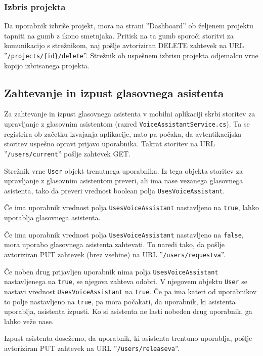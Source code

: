 \documentclass[a4paper, 12pt]{book}
\begin{document}
\subsubsection{Izbris projekta}

Da uporabnik izbriše projekt, mora na strani ''Dashboard'' ob željenem projektu tapniti na gumb z ikono smetnjaka.
Pritisk na ta gumb sporoči storitvi za komunikacijo s strežnikom, naj pošlje avtoriziran DELETE zahtevek na URL ''\texttt{/projects/\{id\}/delete}''.
Strežnik ob uspešnem izbrisu projekta odjemalcu vrne kopijo izbrisanega projekta.

\subsection{Zahtevanje in izpust glasovnega asistenta}

Za zahtevanje in izpust glasovnega asistenta v mobilni aplikaciji skrbi storitev za upravljanje z glasovnim asistentom (razred \texttt{VoiceAssistantService.cs}).
Ta se registrira ob začetku izvajanja aplikacije, nato pa počaka, da avtentikacijska storitev uspešno opravi prijavo uporabnika.
Takrat storitev na URL ''\texttt{/users/current}'' pošlje zahtevek GET.

Strežnik vrne \texttt{User} objekt trenutnega uporabnika.
Iz tega objekta storitev za upravljanje z glasovnim asistentom preveri, ali ima nase vezanega glasovnega asistenta, tako da preveri vrednost boolean polja \texttt{UsesVoiceAssistant}.

Če ima uporabnik vrednost polja \texttt{UsesVoiceAssistant} nastavljeno na \texttt{true}, lahko uporablja glasovnega asistenta.

Če ima uporabnik vrednost polja \texttt{UsesVoiceAssistant} nastavljeno na \texttt{false}, mora uporabo glasovnega asistenta zahtevati.
To naredi tako, da pošlje avtoriziran PUT zahtevek (brez vsebine) na URL ''\texttt{/users/requestva}''.

Če noben drug prijavljen uporabnik nima polja \texttt{UsesVoiceAssistant} nastavljenega na \texttt{true}, se njegova zahteva odobri.
V njegovem objektu \texttt{User} se nastavi vrednost \texttt{UsesVoiceAssistant} na \texttt{true}.
Če pa ima kateri od uporabnikov to polje nastavljeno na \texttt{true}, pa mora počakati, da uporabnik, ki asistenta uporablja, asistenta izpusti.
Ko si asistenta ne lasti nobeden drug uporabnik, ga lahko veže nase.

Izpust asistenta dosežemo, da uporabnik, ki asistenta trentuno uporablja, pošlje avtoriziran PUT zahtevek na URL ''\texttt{/users/releaseva}''.
\end{document}
